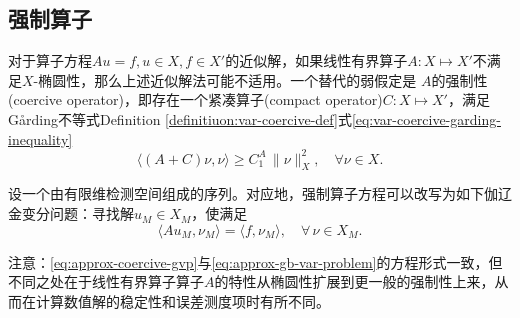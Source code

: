 \subsection{强制算子}
\label{sec:approx-coercive}
对于算子方程$A u = f, u \in X, f \in X'$的近似解，如果线性有界算子$A:X \mapsto X'$不满足$X$-椭圆性，那么上述近似解法可能不适用。一个替代的弱假定是
$A$的强制性(coercive operator)，即存在一个紧凑算子(compact operator)$C:X \mapsto X'$，满足Gårding不等式Definition \ref{definitiuon:var-coercive-def}式\eqref{eq:var-coercive-garding-inequality}
\begin{equation*}
  \langle \left(A + C \right) \nu, \nu \rangle \ge C_1^A \, \big\| \nu \big\|_{X}^2, \quad \forall \nu \in X.
\end{equation*}

设一个由有限维检测空间组成的序列。对应地，强制算子方程可以改写为如下伽辽金变分问题：寻找解$u_{M} \in X_{M}$，使满足
\begin{equation}
  \label{eq:approx-coercive-gvp}
  \langle A u_{M}, \nu_{M} \rangle = \langle f, \nu_{M} \rangle, \quad \forall \, \nu \in X_{M}.
\end{equation}

注意：\eqref{eq:approx-coercive-gvp}与\eqref{eq:approx-gb-var-problem}的方程形式一致，但不同之处在于线性有界算子算子$A$的特性从椭圆性扩展到更一般的强制性上来，从而在计算数值解的稳定性和误差测度项时有所不同。


